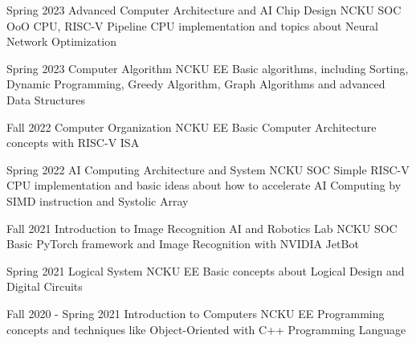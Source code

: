 

\begin{cventries}
  \cventry
  {Spring 2023}
  {Advanced Computer Architecture and AI Chip Design}
  {NCKU SOC}
  {}
  {OoO CPU, RISC-V Pipeline CPU implementation and topics about Neural Network Optimization}

  \cventry
  {Spring 2023}
  {Computer Algorithm}
  {NCKU EE}
  {}
  {Basic algorithms, including Sorting, Dynamic Programming, Greedy Algorithm, Graph Algorithms and advanced Data Structures}

  \cventry
  {Fall 2022} %
  {Computer Organization} %
  {NCKU EE}
  {} %
  {Basic Computer Architecture concepts with RISC-V ISA} %

  \cventry
  {Spring 2022}
  {AI Computing Architecture and System}
  {NCKU SOC}
  {}
  {Simple RISC-V CPU implementation and basic ideas about how to accelerate AI Computing by SIMD instruction and Systolic Array}

  \cventry
  {Fall 2021}
  {Introduction to Image Recognition AI and Robotics Lab}
  {NCKU SOC}
  {}
  {Basic PyTorch framework and Image Recognition with NVIDIA JetBot}

  \cventry
  {Spring 2021}
  {Logical System}
  {NCKU EE}
  {}
  {Basic concepts about Logical Design and Digital Circuits}

  \cventry
  {Fall 2020 - Spring 2021}
  {Introduction to Computers}
  {NCKU EE}
  {}
  {Programming concepts and techniques like Object-Oriented with C++ Programming Language}
\end{cventries}

